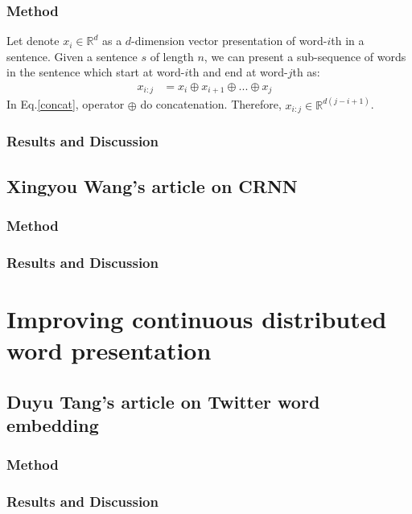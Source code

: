 \subsubsection{Method}
Let denote \(x_i \in \mathbb{R}^d\) as a \(d\)-dimension vector presentation of word-\(i\)th in a sentence. 
Given a sentence \(s\) of length \(n\), we can present a sub-sequence of words in the sentence which start at word-\(i\)th and end at word-\(j\)th as:
\begin{align}
	x_{i:j} &= x_i \oplus x_{i+1} \oplus ... \oplus x_{j} &\label{concat}
\end{align}
In Eq.\eqref{concat}, operator \(\oplus\) do concatenation. Therefore, \(x_{i:j} \in \mathbb{R}^{d(j-i+1)}\). 



\subsubsection{Results and Discussion}


\subsection{Xingyou Wang's article on CRNN}

\subsubsection{Method}

\subsubsection{Results and Discussion}


\section{Improving continuous distributed word presentation}

\subsection{Duyu Tang's article on Twitter word embedding}
\subsubsection{Method}

\subsubsection{Results and Discussion}


